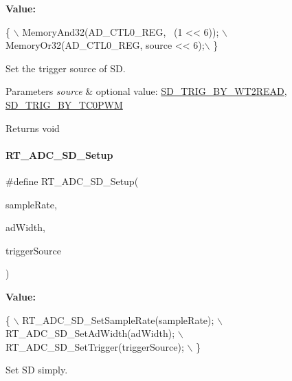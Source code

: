 {\bfseries Value\+:}
\begin{DoxyCode}
\{                                        \(\backslash\)
        MemoryAnd32(AD\_CTL0\_REG, ~(1 << 6)); \(\backslash\)
        MemoryOr32(AD\_CTL0\_REG, source << 6);\(\backslash\)
    \}
\end{DoxyCode}


Set the trigger source of SD. 


\begin{DoxyParams}{Parameters}
{\em source} & optional value\+: \mbox{\hyperlink{a00002_ab266bb772aaf5cffad6bede99cfb094ca9596adcc3a82f8e983e664a6ed5144a6}{S\+D\+\_\+\+T\+R\+I\+G\+\_\+\+B\+Y\+\_\+\+W\+T2\+R\+E\+AD}}, \mbox{\hyperlink{a00002_ab266bb772aaf5cffad6bede99cfb094ca2da9ae6568d907b90ab68f56f8605ada}{S\+D\+\_\+\+T\+R\+I\+G\+\_\+\+B\+Y\+\_\+\+T\+C0\+P\+WM}} \\
\hline
\end{DoxyParams}
\begin{DoxyReturn}{Returns}
void 
\end{DoxyReturn}
\mbox{\label{a00002_a312f152517ab50c1cda791e118dd4473}} 
\paragraph{\texorpdfstring{R\+T\+\_\+\+A\+D\+C\+\_\+\+S\+D\+\_\+\+Setup}{RT\_ADC\_SD\_Setup}}
{\footnotesize\ttfamily \#define R\+T\+\_\+\+A\+D\+C\+\_\+\+S\+D\+\_\+\+Setup(\begin{DoxyParamCaption}\item[{}]{sample\+Rate,  }\item[{}]{ad\+Width,  }\item[{}]{trigger\+Source }\end{DoxyParamCaption})}

{\bfseries Value\+:}
\begin{DoxyCode}
\{                                        \(\backslash\)
        RT\_ADC\_SD\_SetSampleRate(sampleRate); \(\backslash\)
        RT\_ADC\_SD\_SetAdWidth(adWidth);      \(\backslash\)
        RT\_ADC\_SD\_SetTrigger(triggerSource); \(\backslash\)
    \}
\end{DoxyCode}


Set SD simply. 


